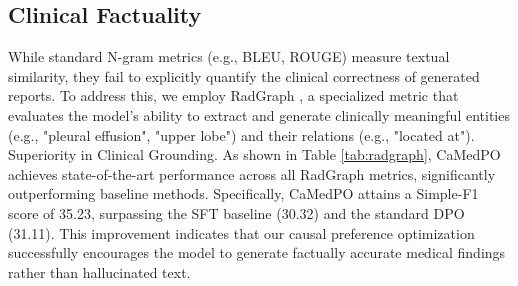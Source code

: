 \begin{table}[t]
\centering
\caption{Ablation study results on VQA-RAD and IU-XRay. “w/” and “w/o” denote with and without, respectively. $^\text{s}$ denotes the model enhanced with SFT.}
\label{tab:ablation}
\end{table}



\subsection{Clinical Factuality}
While standard N-gram metrics (e.g., BLEU, ROUGE) measure textual similarity, they fail to explicitly quantify the clinical correctness of generated reports. To address this, we employ RadGraph \cite{jord2021radgraph}, a specialized metric that evaluates the model's ability to extract and generate clinically meaningful entities (e.g., "pleural effusion", "upper lobe") and their relations (e.g., "located at").
Superiority in Clinical Grounding. As shown in Table \ref{tab:radgraph}, CaMedPO achieves state-of-the-art performance across all RadGraph metrics, significantly outperforming baseline methods. Specifically, CaMedPO attains a Simple-F1 score of 35.23, surpassing the SFT baseline (30.32) and the standard DPO (31.11). This improvement indicates that our causal preference optimization successfully encourages the model to generate factually accurate medical findings rather than hallucinated text.

